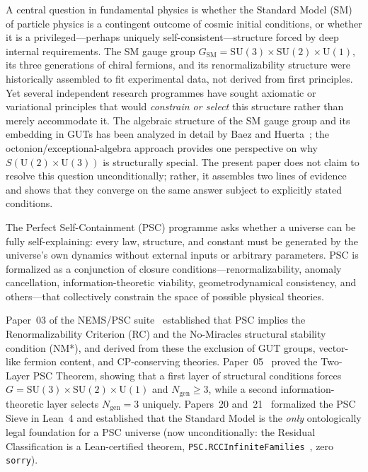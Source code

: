 \documentclass[11pt,twocolumn]{article}
\theoremstyle{remark}
\begin{document}
A central question in fundamental physics is whether the Standard
Model (SM) of particle physics is a contingent outcome of cosmic
initial conditions, or whether it is a privileged---perhaps uniquely
self-consistent---structure forced by deep internal requirements.
The SM gauge group $G_{\mathrm{SM}}=\mathrm{SU}(3)\times\mathrm{SU}(2)
\times\mathrm{U}(1)$, its three generations of chiral fermions, and
its renormalizability structure were historically assembled to fit
experimental data, not derived from first principles.
Yet several independent research programmes have sought axiomatic or
variational principles that would \emph{constrain or select} this
structure rather than merely accommodate it.
The algebraic structure of the SM gauge group and its embedding in GUTs
has been analyzed in detail by Baez and Huerta~\cite{BaezHuerta2010};
the octonion/exceptional-algebra approach provides one perspective
on why $S(\mathrm{U}(2)\times\mathrm{U}(3))$ is structurally special.
The present paper does not claim to resolve this question unconditionally;
rather, it assembles two lines of evidence and shows that they
converge on the same answer subject to explicitly stated conditions.

The Perfect Self-Containment (PSC) programme
\cite{SpivackPhysicsPortal,SpivackNEMSMFRRBridge} asks whether a
universe can be fully self-explaining: every law, structure, and
constant must be generated by the universe's own dynamics without
external inputs or arbitrary parameters.
PSC is formalized as a conjunction of closure conditions—renormalizability,
anomaly cancellation, information-theoretic viability, geometrodynamical
consistency, and others—that collectively constrain the space of
possible physical theories.

Paper~03 of the NEMS/PSC suite~\cite{SpivackNMstar} established that
PSC implies the Renormalizability Criterion (RC) and the No-Miracles
structural stability condition (NM*), and derived from these the
exclusion of GUT groups, vector-like fermion content, and
CP-conserving theories.
Paper~05~\cite{SpivackPSCOpt} proved the Two-Layer PSC Theorem, showing
that a first layer of structural conditions forces
$G=\mathrm{SU}(3)\times\mathrm{SU}(2)\times\mathrm{U}(1)$ and
$N_{\mathrm{gen}}\geq 3$, while a second information-theoretic layer
selects $N_{\mathrm{gen}}=3$ uniquely.
Papers~20 and~21~\cite{SpivackGaugeRigidity,SpivackExistentialRigidity}
formalized the PSC Sieve in Lean~4 and established that the Standard Model is the
\emph{only} ontologically legal foundation for a PSC universe (now unconditionally:
the Residual Classification is a Lean-certified theorem,
\texttt{PSC.RCCInfiniteFamilies}~\cite{ugp-lean}, zero \texttt{sorry}).
\end{document}

